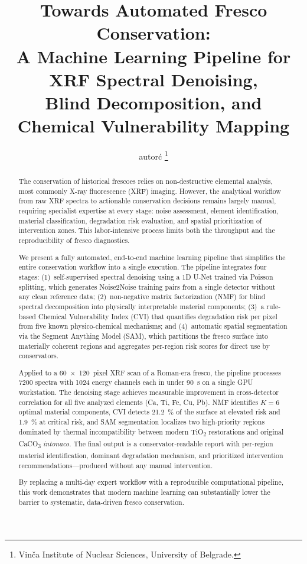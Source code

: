 \documentclass[twocolumn,11pt]{article}
\title{%
  Towards Automated Fresco Conservation:\\
  A Machine Learning Pipeline for XRF Spectral Denoising,\\
  Blind Decomposition, and Chemical Vulnerability Mapping%
}
\author{%
  autor\'{c}%
  \thanks{Vin\v{c}a Institute of Nuclear Sciences, University of Belgrade.}%
}
\date{}
\begin{document}
\maketitle

\begin{abstract}
The conservation of historical frescoes relies on non-destructive elemental
analysis, most commonly X-ray fluorescence (XRF) imaging. However, the
analytical workflow from raw XRF spectra to actionable conservation decisions
remains largely manual, requiring specialist expertise at every stage: noise
assessment, element identification, material classification, degradation risk
evaluation, and spatial prioritization of intervention zones. This
labor-intensive process limits both the throughput and the reproducibility of
fresco diagnostics.

We present a fully automated, end-to-end machine learning pipeline that
simplifies the entire conservation workflow into a single execution. The
pipeline integrates four stages: (1)~self-supervised spectral denoising using a
1D U-Net trained via Poisson splitting, which generates Noise2Noise training
pairs from a single detector without any clean reference data;
(2)~non-negative matrix factorization (NMF) for blind spectral decomposition
into physically interpretable material components; (3)~a rule-based Chemical
Vulnerability Index (CVI) that quantifies degradation risk per pixel from
five known physico-chemical mechanisms; and (4)~automatic spatial segmentation
via the Segment Anything Model (SAM), which partitions the fresco surface into
materially coherent regions and aggregates per-region risk scores for direct
use by conservators.

Applied to a \SI{60x120}{pixel} XRF scan of a Roman-era fresco, the pipeline
processes \num{7200} spectra with \num{1024} energy channels each in under
\SI{90}{\second} on a single GPU workstation. The denoising stage achieves
measurable improvement in cross-detector correlation for all five analyzed
elements (Ca, Ti, Fe, Cu, Pb). NMF identifies $K{=}6$ optimal material
components, CVI detects \SI{21.2}{\percent} of the surface at elevated risk
and \SI{1.9}{\percent} at critical risk, and SAM segmentation localizes two
high-priority regions dominated by thermal incompatibility between modern
TiO\textsubscript{2} restorations and original CaCO\textsubscript{3}
\emph{intonaco}. The final output is a conservator-readable report with
per-region material identification, dominant degradation mechanism, and
prioritized intervention recommendations---produced without any manual
intervention.

By replacing a multi-day expert workflow with a reproducible computational
pipeline, this work demonstrates that modern machine learning can
substantially lower the barrier to systematic, data-driven fresco
conservation.
\end{abstract}
\end{document}
